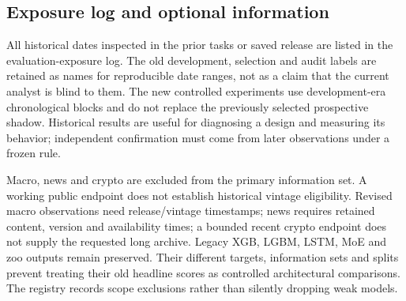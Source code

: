 \subsection{Exposure log and optional information}

All historical dates inspected in the prior tasks or saved release are listed in the evaluation-exposure log. The old development, selection and audit labels are retained as names for reproducible date ranges, not as a claim that the current analyst is blind to them. The new controlled experiments use development-era chronological blocks and do not replace the previously selected prospective shadow. Historical results are useful for diagnosing a design and measuring its behavior; independent confirmation must come from later observations under a frozen rule.

Macro, news and crypto are excluded from the primary information set. A working public endpoint does not establish historical vintage eligibility. Revised macro observations need release/vintage timestamps; news requires retained content, version and availability times; a bounded recent crypto endpoint does not supply the requested long archive. Legacy XGB, LGBM, LSTM, MoE and zoo outputs remain preserved. Their different targets, information sets and splits prevent treating their old headline scores as controlled architectural comparisons. The registry records scope exclusions rather than silently dropping weak models.
